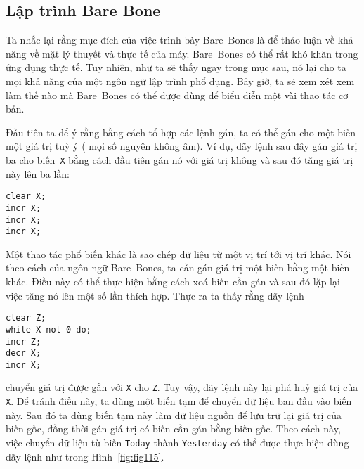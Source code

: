 \subsection*{Lập trình Bare Bone}
Ta nhắc lại rằng mục đích của việc trình bày Bare~Bones là để thảo luận về khả năng về mặt
lý thuyết và thực tế của máy. Bare~Bones có thể rất khó khăn trong ứng dụng thực tế. Tuy
nhiên, như ta sẽ thấy ngay trong mục sau, nó lại cho ta mọi khả năng của một ngôn ngữ lập
trình phổ dụng. Bây giờ, ta sẽ xem xét xem làm thế nào mà Bare~Bones có thể được dùng để
biểu diễn một vài thao tác cơ bản.

Đầu tiên ta để ý rằng bằng cách tổ hợp các lệnh gán, ta có thể gán cho một biến một giá
trị tuỳ ý ( mọi số nguyên không âm). Ví dụ, dãy lệnh sau đây gán giá trị ba cho
biến~\texttt{X} bằng cách đầu tiên gán nó với giá trị không và sau đó tăng giá trị này lên
ba lần:
\begin{flushleft}
\qquad\qquad\qquad  \texttt{clear X;} \\
\qquad\qquad\qquad  \texttt{incr X;} \\
\qquad\qquad\qquad  \texttt{incr X;} \\
\qquad\qquad\qquad  \texttt{incr X;}
\end{flushleft}

Một thao tác phổ biến khác là sao chép dữ liệu từ một vị trí tới vị trí khác. Nói theo
cách của ngôn ngữ Bare~Bones, ta cần gán giá trị một biến bằng một biến khác. Điều này có
thể thực hiện bằng cách xoá biến cần gán và sau đó lặp lại việc tăng nó lên một số lần
thích hợp. Thực ra ta thấy rằng dãy lệnh
\begin{flushleft}
\qquad\qquad\qquad  \texttt{clear Z;} \\
\qquad\qquad\qquad  \texttt{while  X not 0 do;} \\
\qquad\qquad\qquad  \qquad \texttt{incr Z;} \\
\qquad\qquad\qquad  \qquad \texttt{decr X;} \\
\qquad\qquad\qquad  \texttt{incr X;}
\end{flushleft}
chuyển giá trị được gắn với \texttt{X} cho \texttt{Z}. Tuy vậy, dãy lệnh này lại phá huỷ
giá trị của \texttt{X}. Để tránh điều này, ta dùng một biến tạm để chuyển dữ liệu ban đầu
vào biến này. Sau đó ta dùng biến tạm này làm dữ liệu nguồn để lưu trữ lại giá trị của biến
gốc, đồng thời gán giá trị có biến cần gán bằng biến gốc. Theo cách này, việc chuyển dữ
liệu từ biến \texttt{Today} thành \texttt{Yesterday} có thể được thực hiện dùng dãy lệnh
như trong Hình~\ref{fig:fig115}.


